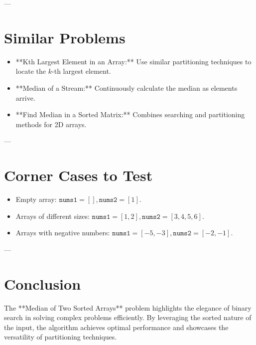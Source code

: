 ---

\section*{Similar Problems}
\begin{itemize}
    \item **Kth Largest Element in an Array:** Use similar partitioning techniques to locate the \(k\)-th largest element.
    \item **Median of a Stream:** Continuously calculate the median as elements arrive.
    \item **Find Median in a Sorted Matrix:** Combines searching and partitioning methods for 2D arrays.
\end{itemize}

---

\section*{Corner Cases to Test}
\begin{itemize}
    \item Empty array: \( \texttt{nums1} = [], \texttt{nums2} = [1] \).
    \item Arrays of different sizes: \( \texttt{nums1} = [1, 2], \texttt{nums2} = [3, 4, 5, 6] \).
    \item Arrays with negative numbers: \( \texttt{nums1} = [-5, -3], \texttt{nums2} = [-2, -1] \).
\end{itemize}

---

\section*{Conclusion}
The **Median of Two Sorted Arrays** problem highlights the elegance of binary search in solving complex problems efficiently. By leveraging the sorted nature of the input, the algorithm achieves optimal performance and showcases the versatility of partitioning techniques.